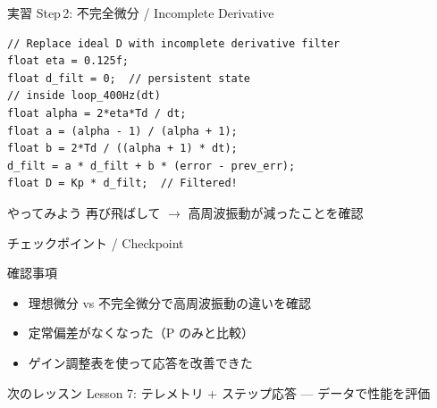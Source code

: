 \documentclass[aspectratio=169, 14pt]{beamer}
\begin{document}
\begin{frame}[fragile]{実習 Step\,2: 不完全微分 / Incomplete Derivative}
  \begin{lstlisting}[style=sfcpp, title={user\_code.cpp (D term replacement)}]
// Replace ideal D with incomplete derivative filter
float eta = 0.125f;
float d_filt = 0;  // persistent state
// inside loop_400Hz(dt)
float alpha = 2*eta*Td / dt;
float a = (alpha - 1) / (alpha + 1);
float b = 2*Td / ((alpha + 1) * dt);
d_filt = a * d_filt + b * (error - prev_err);
float D = Kp * d_filt;  // Filtered!
  \end{lstlisting}

  \begin{exampleblock}{やってみよう}
    再び飛ばして $\to$ 高周波振動が減ったことを確認
  \end{exampleblock}
\end{frame}

\begin{frame}{チェックポイント / Checkpoint}
  \begin{alertblock}{確認事項}
    \begin{itemize}
      \item[$\square$] 理想微分 vs 不完全微分で高周波振動の違いを確認
      \item[$\square$] 定常偏差がなくなった（P のみと比較）
      \item[$\square$] ゲイン調整表を使って応答を改善できた
    \end{itemize}
  \end{alertblock}

  \vspace{1em}

  \begin{block}{次のレッスン}
    Lesson 7: テレメトリ + ステップ応答 --- データで性能を評価
  \end{block}
\end{frame}
\end{document}
